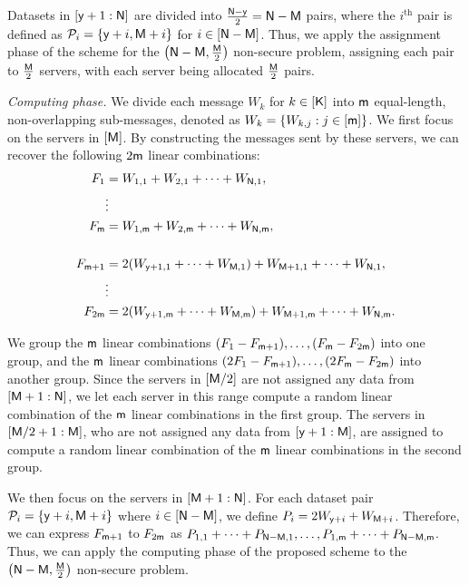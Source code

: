 \documentclass[conference,letterpaper]{IEEEtran}
\begin{document}
Datasets in $[{\sf y}+1 : {\sf N}]$ are divided into $\frac{{\sf N}-{\sf y}}{2} = {\sf N}-{\sf M}$ pairs, where the $i^{\text{th}}$ pair is defined as ${\cal P}_i = \{{\sf y}+i, {\sf M}+i\}$ for $i \in [{\sf N}-{\sf M}]$. Thus, we apply the assignment phase of the scheme for the $\left({\sf N}-{\sf M}, \frac{{\sf M}}{2}\right)$ non-secure problem, assigning each pair to $\frac{{\sf M}}{2}$ servers, with each server being allocated $\frac{{\sf M}}{2}$ pairs.

{\it Computing phase.}
We divide each message $W_k$ for $k \in [{\sf K}]$ into ${\sf m}$ equal-length, non-overlapping sub-messages, denoted as $W_k = \{W_{k,j} : j \in [{\sf m}]\}$.
We first focus on the servers in $[{\sf M}]$. By constructing the messages sent by these servers, we can recover the following $2{\sf m}$ linear combinations:
\begin{align*}
    F_1 &= W_{1,1} + W_{2,1} + \cdots + W_{{\sf N},1}, \\
    &\vdots \\
    F_{{\sf m}} &= W_{1,{\sf m}} + W_{2,{\sf m}} + \cdots + W_{{\sf N},{\sf m}}, \\
    \\
    F_{{\sf m}+1} &= 2(W_{{\sf y}+1,1} + \cdots + W_{{\sf M},1}) + W_{{\sf M}+1,1} + \cdots + W_{{\sf N},1}, \\
    &\vdots \\
    F_{2{\sf m}} &= 2(W_{{\sf y}+1,{\sf m}} + \cdots + W_{{\sf M},{\sf m}}) + W_{{\sf M}+1,{\sf m}} + \cdots + W_{{\sf N},{\sf m}}.
\end{align*}

We group the ${\sf m}$ linear combinations $(F_1 - F_{{\sf m}+1}), \ldots, (F_{{\sf m}} - F_{2{\sf m}})$ into one group, and the ${\sf m}$ linear combinations $(2F_1 - F_{{\sf m}+1}), \ldots, (2F_{{\sf m}} - F_{2{\sf m}})$ into another group. Since the servers in $[{\sf M}/2]$ are not assigned any data from $[{\sf M}+1: {\sf N}]$, we let each server in this range compute a random linear combination of the ${\sf m}$ linear combinations in the first group. The servers in $[{\sf M}/2+1: {\sf M}]$, who are not assigned any data from $[{\sf y}+1: {\sf M}]$, are assigned to compute a random linear combination of the ${\sf m}$ linear combinations in the second group.

We then focus on the servers in $[{\sf M}+1: {\sf N}]$. For each dataset pair ${\cal P}_i = \{{\sf y}+i, {\sf M}+i\}$ where $i \in [{\sf N} - {\sf M}]$, we define $P_i = 2W_{{\sf y}+i} + W_{{\sf M}+i}$. Therefore, we can express $F_{{\sf m}+1}$ to $F_{2{\sf m}}$ as $P_{1,1} + \cdots + P_{{\sf N}-{\sf M},1}, \ldots, P_{1,{\sf m}} + \cdots + P_{{\sf N}-{\sf M},{\sf m}}$.
Thus, we can apply the computing phase of the proposed scheme to the $\left({\sf N} - {\sf M}, \frac{{\sf M}}{2}\right)$ non-secure problem.
\end{document}
